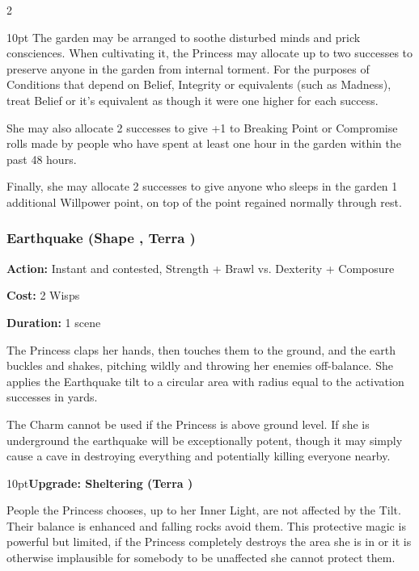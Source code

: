 \begin{multicols}{2}
\begin{myindentpar}{10pt}
The garden may be arranged to soothe disturbed minds and prick consciences. When cultivating it, the Princess may allocate up to two successes to preserve anyone in the garden from internal torment. For the purposes of Conditions that depend on Belief, Integrity or equivalents (such as Madness), treat Belief or it's equivalent as though it were one higher for each success. 

She may also allocate 2 successes to give +1 to Breaking Point or Compromise rolls made by people who have spent at least one hour in the garden within the past 48 hours. 

Finally, she may allocate 2 successes to give anyone who sleeps in the garden 1 additional Willpower point, on top of the point regained normally through rest.\end{myindentpar}

\subsubsection*{Earthquake (Shape \textbullet\textbullet\textbullet\textbullet, Terra \textbullet\textbullet\textbullet)}

\noindent \textbf{Action:} Instant and contested, Strength + Brawl vs. Dexterity + Composure

\noindent \textbf{Cost:} 2 Wisps

\noindent \textbf{Duration:} 1 scene

The Princess claps her hands, then touches them to the ground, and the earth buckles and shakes, pitching wildly and throwing her enemies off-balance. She applies the Earthquake tilt to a circular area with radius equal to the activation successes in yards. 

The Charm cannot be used if the Princess is above ground level. If she is underground the earthquake will be exceptionally potent, though it may simply cause a cave in destroying everything and potentially killing everyone nearby.

\begin{myindentpar}{10pt}\textbf{Upgrade: Sheltering (Terra \textbullet\textbullet\textbullet\textbullet)}

People the Princess chooses, up to her Inner Light, are not affected by the Tilt. Their balance is enhanced and falling rocks avoid them. This protective magic is powerful but limited, if the Princess completely destroys the area she is in or it is otherwise implausible for somebody to be unaffected she cannot protect them.\end{myindentpar}


\end{multicols}
